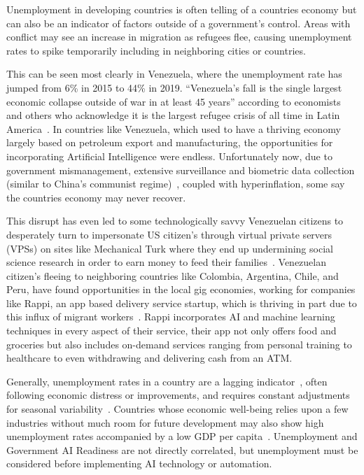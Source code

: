 \documentclass[conference]{IEEEtran}
\begin{document}
Unemployment in developing countries is often telling of a countries economy but can also be an indicator of factors outside of a government's control. Areas with conflict may see an increase in migration as refugees flee, causing unemployment rates to spike temporarily including in neighboring cities or countries.

This can be seen most clearly in Venezuela, where the unemployment rate has jumped from 6\% in 2015 to 44\% in 2019. ``Venezuela's fall is the single largest economic collapse outside of war in at least 45 years'' according to economists and others who acknowledge it is the largest refugee crisis of all time in Latin America~\cite{kurmanaev2019venezuela}. In countries like Venezuela, which used to have a thriving economy largely based on petroleum export and manufacturing, the opportunities for incorporating Artificial Intelligence were endless. Unfortunately now, due to government mismanagement, extensive surveillance and biometric data collection (similar to China's communist regime)~\cite{berwick2018how}, coupled with hyperinflation, some say the countries economy may never recover.

This disrupt has even led to some technologically savvy Venezuelan citizens to desperately turn to impersonate US citizen's through virtual private servers (VPSs) on sites like Mechanical Turk where they end up undermining social science research in order to earn money to feed their families~\cite{kennedy2018venezuela}. Venezuelan citizen's fleeing to neighboring countries like Colombia, Argentina, Chile, and Peru, have found opportunities in the local gig economies, working for companies like Rappi, an app based delivery service startup, which is thriving in part due to this influx of migrant workers~\cite{wyss2019how}. Rappi incorporates AI and machine learning techniques in every aspect of their service, their app not only offers food and groceries but also includes on-demand services ranging from personal training to healthcare to even withdrawing and delivering cash from an ATM.

Generally, unemployment rates in a country are a lagging indicator~\cite{cain1979unemployment}, often following economic distress or improvements, and requires constant adjustments for seasonal variability~\cite{haynes1996unemployment}. Countries whose economic well-being relies upon a few industries without much room for future development may also show high unemployment rates accompanied by a low GDP per capita~\cite{frenkel2006unemployment}. Unemployment and Government AI Readiness are not directly correlated, but unemployment must be considered before implementing AI technology or automation.
\end{document}
